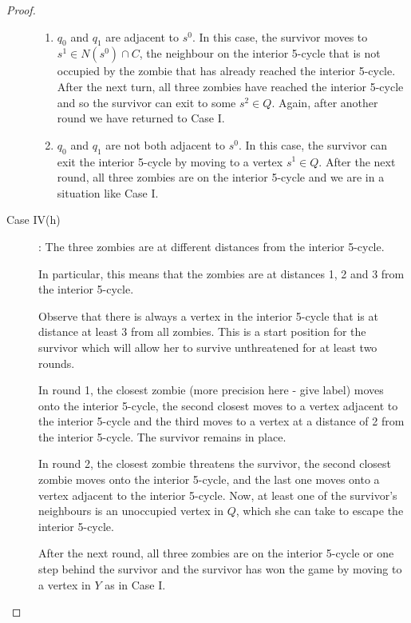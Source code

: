 \begin{proof}
\begin{description}
\begin{enumerate}
\item $q_0$ and $q_1$ are adjacent to $s^0$. In this case, the survivor moves to $s^1 \in N(s^0) \cap C$, the neighbour on the interior 5-cycle that is not occupied
by the zombie that has already reached the interior 5-cycle. After the next turn, all three zombies have reached the interior 5-cycle and so the survivor can
exit to some $s^2 \in Q$. Again, after another round we have returned to Case I.

\item $q_0$ and $q_1$ are not both adjacent to $s^0$. In this case, the survivor can exit the interior 5-cycle by moving to a vertex $s^1 \in Q$. After the next
round, all three zombies are on the interior 5-cycle and we are in a situation like Case I.
\end{enumerate}


\item[Case IV(h)]: The three zombies are at different distances from the interior 5-cycle.

In particular, this means that the zombies are at distances 1, 2 and 3 from the interior 5-cycle.

Observe that there is always a vertex in the interior 5-cycle that is at distance at least 3 from all zombies. This is a start position for the survivor which
will allow her to survive unthreatened for at least two rounds.

In round 1, the closest zombie (more precision here - give label) moves onto the interior 5-cycle, the second closest moves to a vertex adjacent to the interior 5-cycle and the third
moves to a vertex at a distance of 2 from the interior 5-cycle. The survivor remains in place.

In round 2, the closest zombie threatens the survivor, the second closest zombie moves onto the interior 5-cycle, and the last one moves onto a vertex adjacent to the
interior 5-cycle. Now, at least one of the survivor's neighbours is an unoccupied vertex in $Q$, which she can take to escape the interior 5-cycle.

After the next round, all three zombies are on the interior 5-cycle or one step behind the survivor and the survivor has won the game by moving to a vertex in $Y$
as in Case I.
\end{description}
\end{proof}
